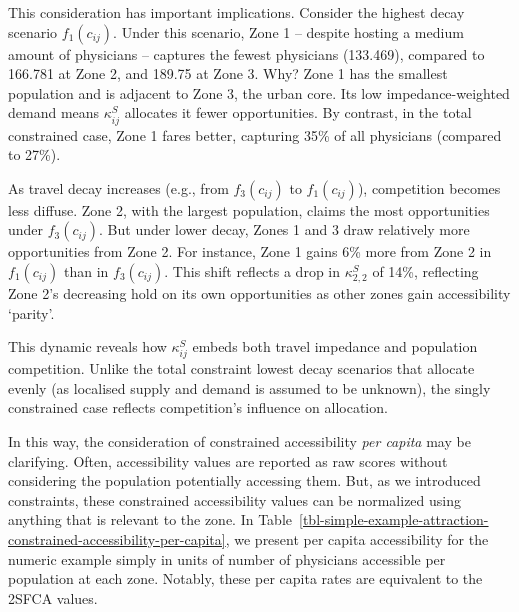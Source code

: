 \documentclass[
  10pt,
  letterpaper,
]{article}
\begin{document}
This consideration has important implications. Consider the highest
decay scenario \(f_1(c_{ij})\). Under this scenario, Zone 1 -- despite
hosting a medium amount of physicians -- captures the fewest physicians
(133.469), compared to 166.781 at Zone 2, and 189.75 at Zone 3. Why?
Zone 1 has the smallest population and is adjacent to Zone 3, the urban
core. Its low impedance-weighted demand means \(\kappa^S_{ij}\)
allocates it fewer opportunities. By contrast, in the total constrained
case, Zone 1 fares better, capturing 35\% of all physicians (compared to
27\%).

As travel decay increases (e.g., from \(f_3(c_{ij})\) to
\(f_1(c_{ij})\)), competition becomes less diffuse. Zone 2, with the
largest population, claims the most opportunities under \(f_3(c_{ij})\).
But under lower decay, Zones 1 and 3 draw relatively more opportunities
from Zone 2. For instance, Zone 1 gains 6\% more from Zone 2 in
\(f_1(c_{ij})\) than in \(f_3(c_{ij})\). This shift reflects a drop in
\(\kappa^S_{2,2}\) of 14\%, reflecting Zone 2's decreasing hold on its
own opportunities as other zones gain accessibility `parity'.

This dynamic reveals how \(\kappa^S_{ij}\) embeds both travel impedance
and population competition. Unlike the total constraint lowest decay
scenarios that allocate evenly (as localised supply and demand is
assumed to be unknown), the singly constrained case reflects
competition's influence on allocation.

In this way, the consideration of constrained accessibility \emph{per
capita} may be clarifying. Often, accessibility values are reported as
raw scores without considering the population potentially accessing
them. But, as we introduced constraints, these constrained accessibility
values can be normalized using anything that is relevant to the zone. In
Table~\ref{tbl-simple-example-attraction-constrained-accessibility-per-capita},
we present per capita accessibility for the numeric example simply in
units of number of physicians accessible per population at each zone.
Notably, these per capita rates are equivalent to the 2SFCA values.
\end{document}
